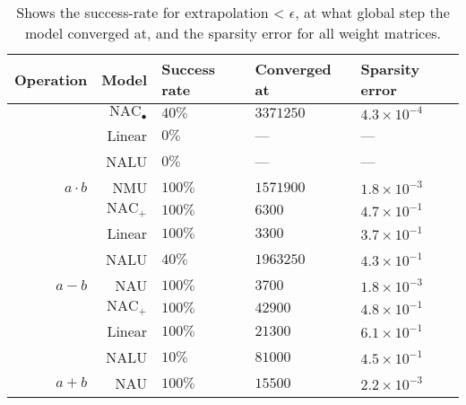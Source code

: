 \begin{table}[H]

\caption{\label{tab:function-task-static-defaults}Shows the success-rate for extrapolation < $\epsilon$, at what global step the model converged at, and the sparsity error for all weight matrices.}
\centering
\begin{tabular}{rrlll}
\toprule
Operation & Model & Success rate & Converged at & Sparsity error\\
\midrule
 & $\mathrm{NAC}_{\bullet}$ & $40\%$ & $3371250$ & $4.3 \times 10^{-4}$\\

 & Linear & $0\%$ & --- & ---\\

 & NALU & $0\%$ & --- & ---\\

\multirow{-4}{*}{\raggedleft\arraybackslash ${a \cdot b}$} & NMU & $100\%$ & $1571900$ & $1.8 \times 10^{-3}$\\
\cmidrule{1-5}
 & $\mathrm{NAC}_{+}$ & $100\%$ & $6300$ & $4.7 \times 10^{-1}$\\

 & Linear & $100\%$ & $3300$ & $3.7 \times 10^{-1}$\\

 & NALU & $40\%$ & $1963250$ & $4.3 \times 10^{-1}$\\

\multirow{-4}{*}{\raggedleft\arraybackslash $a - b$} & NAU & $100\%$ & $3700$ & $1.8 \times 10^{-3}$\\
\cmidrule{1-5}
 & $\mathrm{NAC}_{+}$ & $100\%$ & $42900$ & $4.8 \times 10^{-1}$\\

 & Linear & $100\%$ & $21300$ & $6.1 \times 10^{-1}$\\

 & NALU & $10\%$ & $81000$ & $4.5 \times 10^{-1}$\\

\multirow{-4}{*}{\raggedleft\arraybackslash $a + b$} & NAU & $100\%$ & $15500$ & $2.2 \times 10^{-3}$\\
\bottomrule
\end{tabular}
\end{table}

